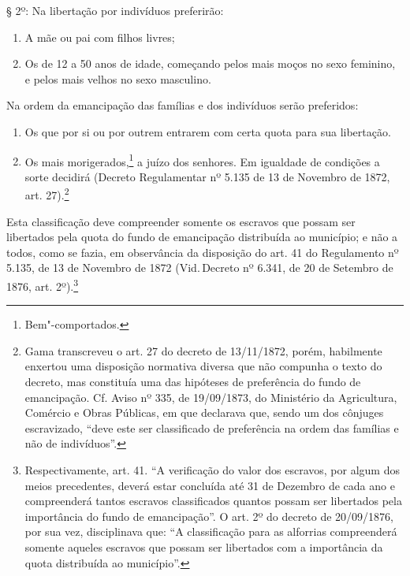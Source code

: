§ 2º: Na libertação por indivíduos preferirão:

\begin{enumerate}[label={\scshape\roman*.}]
\item A mãe ou pai com filhos livres;

\item Os de 12 a 50 anos de idade, começando pelos mais moços no sexo
feminino, e pelos mais velhos no sexo masculino.
\end{enumerate}

Na ordem da emancipação das famílias e dos indivíduos serão preferidos:

\begin{enumerate}[label=\arabic*º]
\item Os que por si ou por outrem entrarem com certa quota para sua
libertação.

\item Os mais morigerados,\footnote{Bem"-comportados.} a juízo dos
senhores. Em igualdade de condições a sorte decidirá (Decreto
Regulamentar nº 5.135 de 13 de Novembro de 1872, art. 27).\footnote{
  Gama transcreveu o art. 27 do decreto de 13/11/1872, porém, habilmente
  enxertou uma disposição normativa diversa que não compunha o texto do
  decreto, mas constituía uma das hipóteses de preferência do
  fundo de emancipação. Cf. Aviso nº 335, de 19/09/1873, do Ministério
  da Agricultura, Comércio e Obras Públicas, em que declarava que, sendo
  um dos cônjuges escravizado, ``deve este ser classificado de
  preferência na ordem das famílias e não de indivíduos''.}
\end{enumerate}  

Esta classificação deve compreender somente os escravos que possam ser
libertados pela quota do fundo de emancipação distribuída ao município;
e não a todos, como se fazia, em observância da disposição do art. 41 do
Regulamento nº 5.135, de 13 de Novembro de 1872 (Vid.\,Decreto nº 6.341,
de 20 de Setembro de 1876, art. 2º).\footnote{Respectivamente, art.
  41. ``A verificação do valor dos escravos, por algum dos meios
  precedentes, deverá estar concluída até 31 de Dezembro de cada ano e
  compreenderá tantos escravos classificados quantos possam ser
  libertados pela importância do fundo de emancipação''. O art. 2º do
  decreto de 20/09/1876, por sua vez, disciplinava que: ``A classificação
  para as alforrias compreenderá somente aqueles escravos que possam ser
  libertados com a importância da quota distribuída ao município''.}

